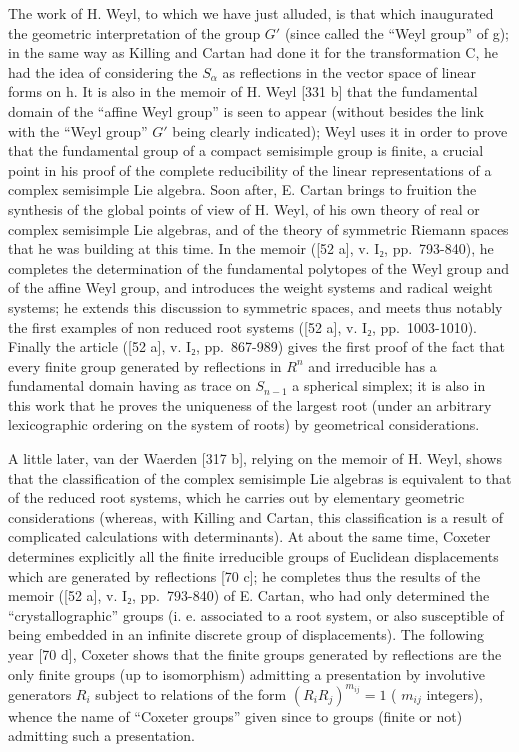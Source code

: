 The work of H. Weyl, to which we have just alluded, is that which inaugurated the geometric interpretation of the group \(G'\) (since called the ``Weyl group'' of g); in the same way as Killing and Cartan had done it for the transformation C, he had the idea of considering the \(S_{\alpha}\) as reflections in the vector space of linear forms on h. It is also in the memoir of H. Weyl {[}331 b{]} that the fundamental domain of the ``affine Weyl group'' is seen to appear (without besides the link with the ``Weyl group'' \(G'\) being clearly indicated); Weyl uses it in order to prove that the fundamental group of a compact semisimple group is finite, a crucial point in his proof of the complete reducibility of the linear representations of a complex semisimple Lie algebra. Soon after, E. Cartan brings to fruition the synthesis of the global points of view of H. Weyl, of his own theory of real or complex semisimple Lie algebras, and of the theory of symmetric Riemann spaces that he was building at this time. In the memoir ({[}52 a{]}, v. I₂, pp.~793-840), he completes the determination of the fundamental polytopes of the Weyl group and of the affine Weyl group, and introduces the weight systems and radical weight systems; he extends this discussion to symmetric spaces, and meets thus notably the first examples of non reduced root systems ({[}52 a{]}, v. I₂, pp.~1003-1010). Finally the article ({[}52 a{]}, v. I₂, pp.~867-989) gives the first proof of the fact that every finite group generated by reflections in \(R^{n}\) and irreducible has a fundamental domain having as trace on \(S_{n-1}\) a spherical simplex; it is also in this work that he proves the uniqueness of the largest root (under an arbitrary lexicographic ordering on the system of roots) by geometrical considerations.

A little later, van der Waerden {[}317 b{]}, relying on the memoir of H. Weyl, shows that the classification of the complex semisimple Lie algebras is equivalent to that of the reduced root systems, which he carries out by elementary geometric considerations (whereas, with Killing and Cartan, this classification is a result of complicated calculations with determinants). At about the same time, Coxeter determines explicitly all the finite irreducible groups of Euclidean displacements which are generated by reflections {[}70 c{]}; he completes thus the results of the memoir ({[}52 a{]}, v. I₂, pp.~793-840) of E. Cartan, who had only determined the ``crystallographic'' groups (i. e. associated to a root system, or also susceptible of being embedded in an infinite discrete group of displacements). The following year {[}70 d{]}, Coxeter shows that the finite groups generated by reflections are the only finite groups (up to isomorphism) admitting a presentation by involutive generators \(R_i\) subject to relations of the form \((R_i R_j)^{m_{ij}} = 1\) ( \(m_{ij}\) integers), whence the name of ``Coxeter groups'' given since to groups (finite or not) admitting such a presentation.

